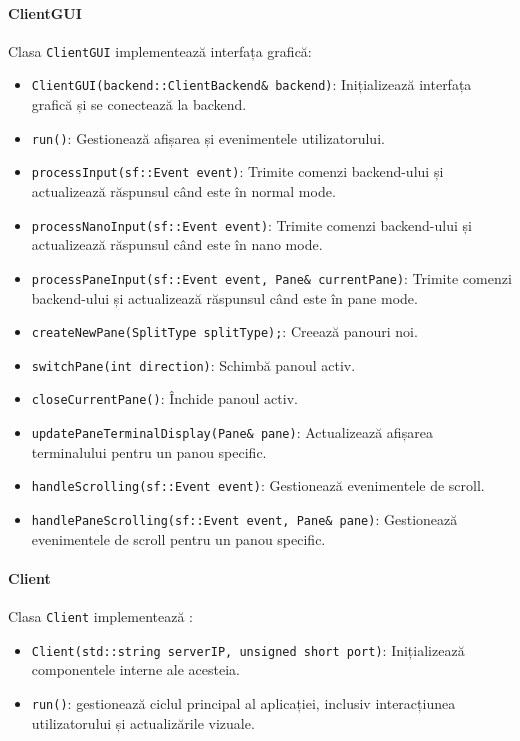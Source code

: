 \documentclass[runningheads]{llncs}
\begin{document}
\paragraph{ClientGUI}
Clasa \texttt{ClientGUI} implementează interfața grafică:
\begin{itemize}
    \item \texttt{ClientGUI(backend::ClientBackend\& backend)}: Inițializează interfața grafică și se conectează la backend.
    \item \texttt{run()}: Gestionează afișarea și evenimentele utilizatorului.
    \item \texttt{processInput(sf::Event event)}: Trimite comenzi backend-ului și actualizează răspunsul când este în normal mode.
    \item \texttt{processNanoInput(sf::Event event)}: Trimite comenzi backend-ului și actualizează răspunsul când este în nano mode.
    \item \texttt{processPaneInput(sf::Event event, Pane\& currentPane)}: Trimite comenzi backend-ului și actualizează răspunsul când este în pane mode.
    \item \texttt{createNewPane(SplitType splitType);}: Creează panouri noi.
    \item \texttt{switchPane(int direction)}: Schimbă panoul activ.
    \item \texttt{closeCurrentPane()}: Închide panoul activ.
    \item \texttt{updatePaneTerminalDisplay(Pane\& pane)}: Actualizează afișarea terminalului pentru un panou specific.
    \item \texttt{handleScrolling(sf::Event event)}: Gestionează evenimentele de scroll.
    \item \texttt{handlePaneScrolling(sf::Event event, Pane\& pane)}: Gestionează evenimentele de scroll pentru un panou specific.

\end{itemize}

\paragraph{Client}
Clasa \texttt{Client} implementează :
\begin{itemize}
    \item \texttt{Client(std::string serverIP, unsigned short port)}: Inițializează componentele interne ale acesteia.
    \item \texttt{run()}: gestionează ciclul principal al aplicației, inclusiv interacțiunea utilizatorului și actualizările vizuale.
\end{itemize}
\end{document}

